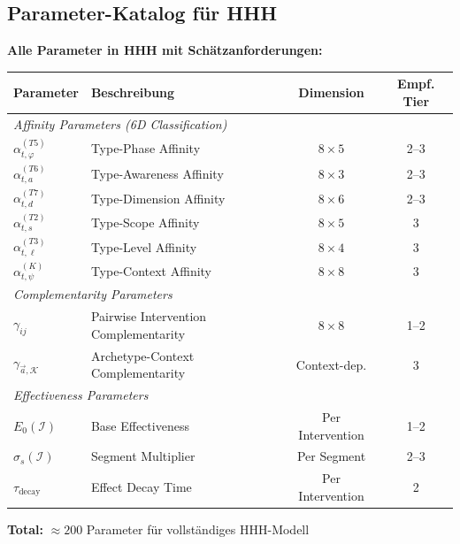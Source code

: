 \subsection{Parameter-Katalog für HHH}

\begin{tcolorbox}[colback=yellow!5!white, colframe=yellow!75!black,
    title=\textbf{Definition EI-D1: HHH Parameter Catalog}]

\textbf{Alle Parameter in HHH mit Schätzanforderungen:}

\renewcommand{\arraystretch}{1.2}
\begin{center}
\begin{tabular}{@{}lp{4cm}cc@{}}
\toprule
\textbf{Parameter} & \textbf{Beschreibung} & \textbf{Dimension} & \textbf{Empf. Tier} \\
\midrule
\multicolumn{4}{l}{\textit{Affinity Parameters (6D Classification)}} \\
$\alpha^{(T5)}_{t,\varphi}$ & Type-Phase Affinity & $8 \times 5$ & 2--3 \\
$\alpha^{(T6)}_{t,a}$ & Type-Awareness Affinity & $8 \times 3$ & 2--3 \\
$\alpha^{(T7)}_{t,d}$ & Type-Dimension Affinity & $8 \times 6$ & 2--3 \\
$\alpha^{(T2)}_{t,s}$ & Type-Scope Affinity & $8 \times 5$ & 3 \\
$\alpha^{(T3)}_{t,\ell}$ & Type-Level Affinity & $8 \times 4$ & 3 \\
$\alpha^{(K)}_{t,\psi}$ & Type-Context Affinity & $8 \times 8$ & 3 \\
\midrule
\multicolumn{4}{l}{\textit{Complementarity Parameters}} \\
$\gamma_{ij}$ & Pairwise Intervention Complementarity & $8 \times 8$ & 1--2 \\
$\gamma_{\vec{a},\mathcal{K}}$ & Archetype-Context Complementarity & Context-dep. & 3 \\
\midrule
\multicolumn{4}{l}{\textit{Effectiveness Parameters}} \\
$E_0(\mathcal{I})$ & Base Effectiveness & Per Intervention & 1--2 \\
$\sigma_s(\mathcal{I})$ & Segment Multiplier & Per Segment & 2--3 \\
$\tau_{\text{decay}}$ & Effect Decay Time & Per Intervention & 2 \\
\bottomrule
\end{tabular}
\end{center}

\textbf{Total:} $\approx 200$ Parameter für vollständiges HHH-Modell

\end{tcolorbox}

